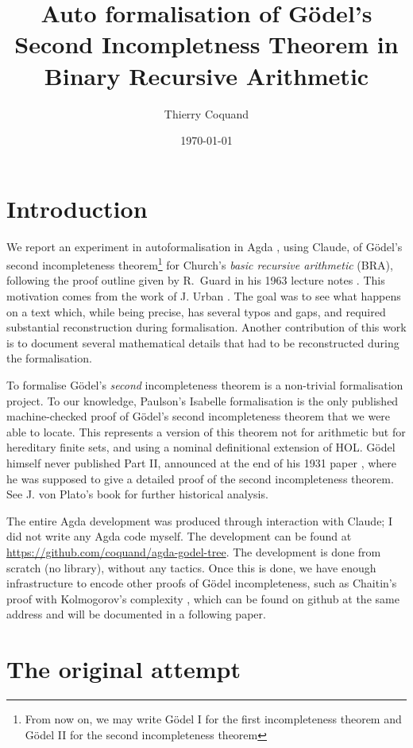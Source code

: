\documentclass[11pt]{article}
\title{Auto formalisation of G\"odel's Second Incompletness Theorem in Binary Recursive Arithmetic}
\author{Thierry Coquand}
\affil{Computer Science and Engineering Department,
University of Gothenburg, Sweden,
\href{mailto:coquand@chalmers.se}{coquand@chalmers.se}
}
\date{\today}
\theoremstyle{plain}
\theoremstyle{definition}
\theoremstyle{remark}
\begin{document}
\maketitle

\section*{Introduction}

We report an experiment in autoformalisation in Agda \cite{17Provers},
using Claude,
of G\"odel's second incompleteness theorem\footnote{From now on, we may write G\"odel I for the first incompleteness
theorem and G\"odel II for the second incompleteness theorem} for Church's \emph{basic
recursive arithmetic} (BRA), following the proof outline given by
R.~Guard in his 1963 lecture notes \cite{Guard63}. This motivation comes from
the work of J. Urban \cite{Urban26}. The goal was to see what happens
on a text which, while being precise, has several typos and gaps, and
required substantial reconstruction during formalisation.
Another contribution of this work is to document several mathematical details that had to be reconstructed
during the formalisation.

To formalise G\"odel's {\em second} incompleteness theorem  is a non-trivial formalisation project. To our knowledge, Paulson's
Isabelle formalisation \cite{Paulson14}
is the only published machine-checked proof of Gödel's second incompleteness theorem that we were able to locate.
This represents a version of this theorem not for arithmetic but for hereditary finite sets, and using a nominal
definitional extension of HOL. G\"odel himself never published Part II, announced at the end of his 1931 paper \cite{Goedel31},
where he was supposed to give a detailed proof of the second incompleteness theorem. See J. von Plato's book \cite{vonPlato20}
for further historical analysis.

The entire Agda development was produced through interaction with Claude; I did not write any Agda code myself.
The development can be found at \url{https://github.com/coquand/agda-godel-tree}. The development is done from
scratch (no library), without any tactics. Once this is done, we have enough infrastructure to encode other proofs
of G\"odel incompleteness, such as Chaitin's proof with Kolmogorov's complexity \cite{Chaitin74},
which can be found on github at the
same address and will be documented in a following paper.

\section{The original attempt}
\end{document}
